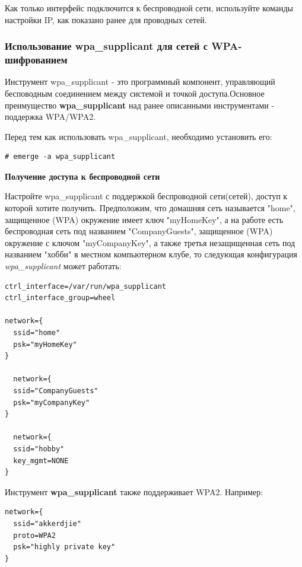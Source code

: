 \documentclass[10pt]{book}
\begin{document}
Как только интерфейс подключится к беспроводной сети, используйте команды настройки IP, как показано ранее для проводных сетей. 

\subsubsection{Использование wpa\_supplicant для сетей с WPA-шифрованием}
Инструмент wpa\_supplicant - это программный компонент, управляющий бесповодным соединением между системой и точкой доступа.Основное преимущество \textbf{wpa\_supplicant} над ранее описанными инструментами - поддержка WPA/WPA2.

Перед тем как использовать wpa\_supplicant, необходимо установить его:

\begin{tcolorbox}
\begin{lstlisting}
# emerge -a wpa_supplicant
\end{lstlisting}
\end{tcolorbox}

\textbf{Получение доступа к беспроводной сети}

Настройте wpa\_supplicant с поддержкой беспроводной сети(сетей), доступ к которой хотите получить. Предположим, что домашняя сеть называется "home"{}, защищенное (WPA) окружение имеет ключ "myHomeKey"{}, а на работе есть беспроводная сеть под названием "CompanyGuests", защищенное (WPA) окружение с ключом "myCompanyKey", а также третья незащищенная сеть под названием "хобби"{} в местном компьютерном клубе, то следующая конфигурация \textit{wpa\_supplicant} может работать:

\begin{tcolorbox}
\begin{lstlisting}
ctrl_interface=/var/run/wpa_supplicant
ctrl_interface_group=wheel

network={
  ssid="home"
  psk="myHomeKey"
}

  network={
  ssid="CompanyGuests"
  psk="myCompanyKey"
}

  network={
  ssid="hobby"
  key_mgmt=NONE
}
\end{lstlisting}
\end{tcolorbox}
Инструмент \textbf{wpa\_supplicant} также поддерживает WPA2. Например:
\begin{tcolorbox}
\begin{lstlisting}
network={
  ssid="akkerdjie"
  proto=WPA2
  psk="highly private key"
}
\end{lstlisting}
\end{tcolorbox}
\end{document}
